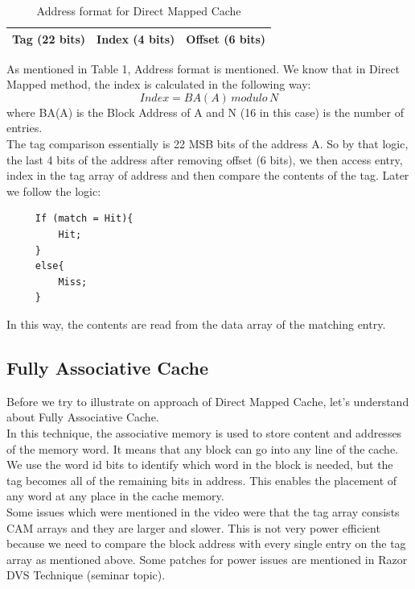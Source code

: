 \documentclass[12pt]{article}
\begin{document}
\begin{table}[]
\begin{center}

\begin{tabular}{|l|c|l|}
\hline
\textbf{Tag (22 bits)} & \textbf{Index (4 bits)} & \textbf{Offset (6 bits)} \\ \hline
\end{tabular}
\caption{Address format for Direct Mapped Cache}
\end{center}
\end{table}
As mentioned in Table 1, Address format is mentioned. We know that in Direct Mapped method, the index is calculated in the following way:
\begin{equation*}
    Index = BA(A) \,  modulo \, N
\end{equation*}
where BA(A) is the Block Address of A and N (16 in this case) is the number of entries. \\

The tag comparison essentially is 22 MSB bits of the address A.
So by that logic, the last 4 bits of the address after removing offset (6 bits), we then access entry, index in the tag array of address and then compare the contents of the tag. 
Later we follow the logic:
\begin{verbatim}
     If (match = Hit){
         Hit;
     }
     else{
         Miss;
     }
\end{verbatim}
In this way, the contents are read from the data array of the matching entry. 
\subsection{Fully Associative Cache}
Before we try to illustrate on approach of Direct Mapped Cache, let's understand about Fully Associative Cache. \\

In this technique, the associative memory is used to store content and addresses of the memory word. It means that any block can go into any line of the cache. We use the word id bits to identify which word in the block is needed, but the tag becomes all of the remaining bits in address. This enables the placement of any word at any place in the cache memory.  \\

Some issues which were mentioned in the video were that the tag array consists CAM arrays and they are larger and slower. This is not very power efficient because we need to compare the block address with every single entry on the tag array as mentioned above. Some patches for power issues are mentioned in Razor DVS Technique (seminar topic). \\
\end{document}
